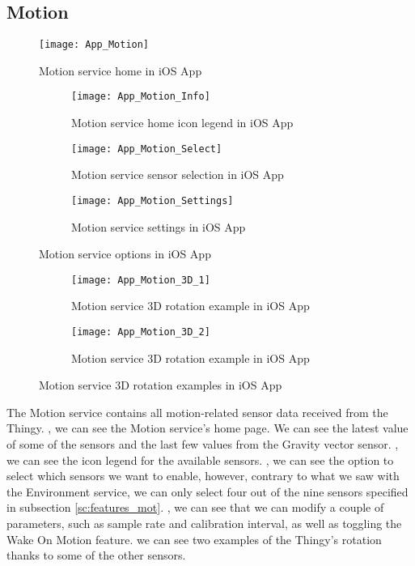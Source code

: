 \subsection{Motion}
\begin{figure}[hbt!]
	\centering
	\texttt{[image: App\_Motion]}
	\caption{Motion service home in iOS App}
	\label{fig:app_motion}
\end{figure}
\begin{figure}[hbt!]
	\centering
	\begin{subfigure}{.31\textwidth}
		\centering
		\texttt{[image: App\_Motion\_Info]}
		\caption{Motion service home icon legend in iOS App}
		\label{fig:app_motion_info}
	\end{subfigure}
	\begin{subfigure}{.31\textwidth}
		\centering
		\texttt{[image: App\_Motion\_Select]}
		\caption{Motion service sensor selection in iOS App}
		\label{fig:app_motion_select}
	\end{subfigure}
	\begin{subfigure}{.31\textwidth}
		\centering
		\texttt{[image: App\_Motion\_Settings]}
		\caption{Motion service settings in iOS App}
		\label{fig:app_motion_settings}
	\end{subfigure}
	\caption{Motion service options in iOS App}
	\label{fig:app_motion_options}
\end{figure}
\begin{figure}[hbt!]
	\begin{subfigure}{.5\textwidth}
		\centering
		\texttt{[image: App\_Motion\_3D\_1]}
		\caption{Motion service 3D rotation example in iOS App}
		\label{fig:app_motion_3D_1}
	\end{subfigure}
	\begin{subfigure}{.5\textwidth}
		\centering
		\texttt{[image: App\_Motion\_3D\_2]}
		\caption{Motion service 3D rotation example in iOS App}
		\label{fig:app_motion_3D_2}
	\end{subfigure}
	\caption{Motion service 3D rotation examples in iOS App}
	\label{fig:app_motion_3D}
\end{figure}
The Motion service contains all motion-related sensor data received from the Thingy. , we can see the Motion service's home page. We can see the latest value of some of the sensors and the last few values from the Gravity vector sensor. , we can see the icon legend for the available sensors. , we can see the option to select which sensors we want to enable, however, contrary to what we saw with the Environment service, we can only select four out of the nine sensors specified in subsection \ref{sc:features_mot}. , we can see that we can modify a couple of parameters, such as sample rate and calibration interval, as well as toggling the Wake On Motion feature.  we can see two examples of the Thingy's rotation thanks to some of the other sensors.

